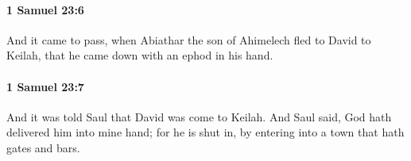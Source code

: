 		\paragraph{1 Samuel 23:6} %
			\label{1SAMUEL-23-6}

			And it came to pass, when Abiathar the son of Ahimelech fled to David to Keilah, that he came down with an ephod in his hand.


		\paragraph{1 Samuel 23:7} %
			\label{1SAMUEL-23-7}

			And it was told Saul that David was come to Keilah. And Saul said, God hath delivered him into mine hand; for he is shut in, by entering into a town that hath gates and bars.


